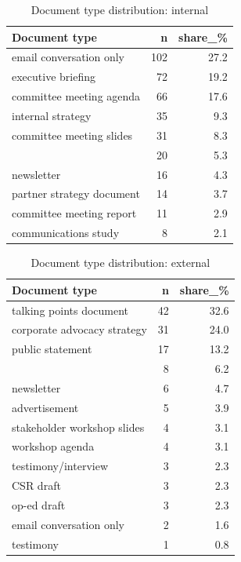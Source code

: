 \begin{table}
\caption{Document type distribution: internal}
\label{tab:doc-type-internal}
\begin{tabular}{lrr}
\toprule
Document type & n & share\_\% \\
\midrule
email conversation only & 102 & 27.2 \\
executive briefing & 72 & 19.2 \\
committee meeting agenda & 66 & 17.6 \\
internal strategy & 35 & 9.3 \\
committee meeting slides & 31 & 8.3 \\
 & 20 & 5.3 \\
newsletter & 16 & 4.3 \\
partner strategy document & 14 & 3.7 \\
committee meeting report & 11 & 2.9 \\
communications study & 8 & 2.1 \\
\bottomrule
\end{tabular}
\end{table}

\begin{table}
\caption{Document type distribution: external}
\label{tab:doc-type-external}
\begin{tabular}{lrr}
\toprule
Document type & n & share\_\% \\
\midrule
talking points document & 42 & 32.6 \\
corporate advocacy strategy & 31 & 24.0 \\
public statement & 17 & 13.2 \\
 & 8 & 6.2 \\
newsletter & 6 & 4.7 \\
advertisement & 5 & 3.9 \\
stakeholder workshop slides & 4 & 3.1 \\
workshop agenda & 4 & 3.1 \\
testimony/interview & 3 & 2.3 \\
CSR draft & 3 & 2.3 \\
op-ed draft & 3 & 2.3 \\
email conversation only & 2 & 1.6 \\
testimony & 1 & 0.8 \\
\bottomrule
\end{tabular}
\end{table}

